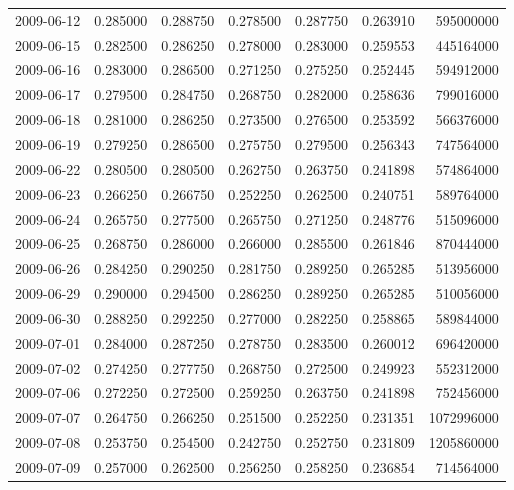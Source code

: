 \begin{tabular}{lrrrrrr}
2009-06-12 &    0.285000 &    0.288750 &    0.278500 &    0.287750 &    0.263910 &   595000000 \\
2009-06-15 &    0.282500 &    0.286250 &    0.278000 &    0.283000 &    0.259553 &   445164000 \\
2009-06-16 &    0.283000 &    0.286500 &    0.271250 &    0.275250 &    0.252445 &   594912000 \\
2009-06-17 &    0.279500 &    0.284750 &    0.268750 &    0.282000 &    0.258636 &   799016000 \\
2009-06-18 &    0.281000 &    0.286250 &    0.273500 &    0.276500 &    0.253592 &   566376000 \\
2009-06-19 &    0.279250 &    0.286500 &    0.275750 &    0.279500 &    0.256343 &   747564000 \\
2009-06-22 &    0.280500 &    0.280500 &    0.262750 &    0.263750 &    0.241898 &   574864000 \\
2009-06-23 &    0.266250 &    0.266750 &    0.252250 &    0.262500 &    0.240751 &   589764000 \\
2009-06-24 &    0.265750 &    0.277500 &    0.265750 &    0.271250 &    0.248776 &   515096000 \\
2009-06-25 &    0.268750 &    0.286000 &    0.266000 &    0.285500 &    0.261846 &   870444000 \\
2009-06-26 &    0.284250 &    0.290250 &    0.281750 &    0.289250 &    0.265285 &   513956000 \\
2009-06-29 &    0.290000 &    0.294500 &    0.286250 &    0.289250 &    0.265285 &   510056000 \\
2009-06-30 &    0.288250 &    0.292250 &    0.277000 &    0.282250 &    0.258865 &   589844000 \\
2009-07-01 &    0.284000 &    0.287250 &    0.278750 &    0.283500 &    0.260012 &   696420000 \\
2009-07-02 &    0.274250 &    0.277750 &    0.268750 &    0.272500 &    0.249923 &   552312000 \\
2009-07-06 &    0.272250 &    0.272500 &    0.259250 &    0.263750 &    0.241898 &   752456000 \\
2009-07-07 &    0.264750 &    0.266250 &    0.251500 &    0.252250 &    0.231351 &  1072996000 \\
2009-07-08 &    0.253750 &    0.254500 &    0.242750 &    0.252750 &    0.231809 &  1205860000 \\
2009-07-09 &    0.257000 &    0.262500 &    0.256250 &    0.258250 &    0.236854 &   714564000 \\

\end{tabular}

